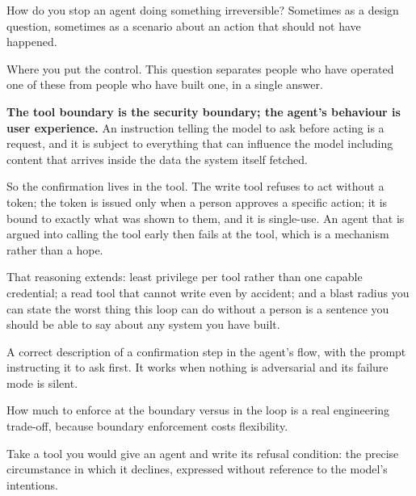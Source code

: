 \begin{bankq}{How do you stop an agent doing something irreversible?}
\qasked
Sometimes as a design question, sometimes as a scenario about an action that
should not have happened.

\qtested
Where you put the control. This question separates people who have operated one
of these from people who have built one, in a single answer.

\qstaff
\textbf{The tool boundary is the security boundary; the agent's behaviour is
user experience.} An instruction telling the model to ask before acting is a
request, and it is subject to everything that can influence the model
\dash{} including content that arrives inside the data the system itself
fetched.

So the confirmation lives in the tool. The write tool refuses to act without a
token; the token is issued only when a person approves a specific action; it is
bound to exactly what was shown to them, and it is single-use. An agent that is
argued into calling the tool early then fails at the tool, which is a mechanism
rather than a hope.


That reasoning extends: least privilege per tool rather than one capable
credential; a read tool that cannot write even by accident; and a blast radius
you can state \dash{} the worst thing this loop can do without a person is a
sentence you should be able to say about any system you have built.

\qsenior
A correct description of a confirmation step in the agent's flow, with the
prompt instructing it to ask first. It works when nothing is adversarial and
its failure mode is silent.

\qcontested
How much to enforce at the boundary versus in the loop is a real engineering
trade-off, because boundary enforcement costs flexibility.

\qdrill
Take a tool you would give an agent and write its refusal condition: the
precise circumstance in which it declines, expressed without reference to the
model's intentions.
\end{bankq}

